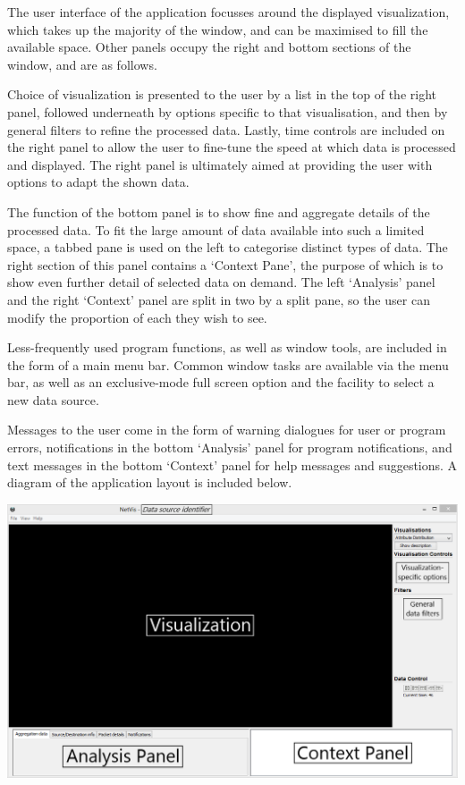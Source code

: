 The user interface of the application focusses around the displayed
visualization, which takes up the majority of the window, and can be maximised
to fill the available space. Other panels occupy the right and bottom sections
of the window, and are as follows.

Choice of visualization is presented to the user by a list in the top of the
right panel, followed underneath by options specific to that visualisation, and
then by general filters to refine the processed data. Lastly, time controls are
included on the right panel to allow the user to fine-tune the speed at which
data is processed and displayed. The right panel is ultimately aimed at
providing the user with options to adapt the shown data.

The function of the bottom panel is to show fine and aggregate details of the
processed data. To fit the large amount of data available into such a limited
space, a tabbed pane is used on the left to categorise distinct types of data.
The right section of this panel contains a `Context Pane', the purpose of
which is to show even further detail of selected data on demand. The left
`Analysis' panel and the right `Context' panel are split in two by a split
pane, so the user can modify the proportion of each they wish to see.

Less-frequently used program functions, as well as window tools, are included
in the form of a main menu bar. Common window tasks are available via the menu
bar, as well as an exclusive-mode full screen option and the facility to select
a new data source.

Messages to the user come in the form of warning dialogues for user or program
errors, notifications in the bottom `Analysis' panel for program notifications,
and text messages in the bottom `Context' panel for help messages and
suggestions. A diagram of the application layout is included below.

\includegraphics[width=\linewidth]{materials/layout-diagram.png}
